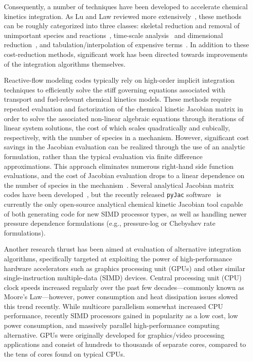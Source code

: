 \documentclass[preprint,12pt]{elsarticle}
\begin{document}
Consequently, a number of techniques have been developed to accelerate chemical kinetics integration.
As Lu and Law reviewed more extensively~\cite{Lu:2009gh}, these methods can be roughly categorized into three classes: skeletal reduction and removal of unimportant species and reactions~\cite{vajda_pca,rabitz_sa,turanyi_sa_1,turanyi_sa_2,Lu:2005,Lu:2006bb,valorani_csp,valorani_csp2,Lu:2008bi,Pepiot-Desjardins:2008,Niemeyer:2010bt,Niemeyer:2014,Curtis:2015aa}, time-scale analysis~\cite{qssa,pe_approx1,pe_approx2} and dimensional reduction~\cite{Lam:1988wc,Maas:1992aa,Lam:1993ub,Lam:1994ws,Lu:2001ve}, and tabulation\slash interpolation of expensive terms~\cite{Pope:1997wu,Christo1996,Tonse:1999aa}.
In addition to these cost-reduction methods, significant work has been directed towards improvements of the integration algorithms themselves.

Reactive-flow modeling codes typically rely on high-order implicit integration techniques to efficiently solve the stiff governing equations associated with transport and fuel-relevant chemical kinetics models.
These methods require repeated evaluation and factorization of the chemical kinetic Jacobian matrix in order to solve the associated non-linear algebraic equations through iterations of linear system solutions, the cost of which scales quadratically and cubically, respectively, with the number of species in a mechanism.
However, significant cost savings in the Jacobian evaluation can be realized through the use of an analytic formulation, rather than the typical evaluation via finite difference approximations.
This approach eliminates numerous right-hand side function evaluations, and the cost of Jacobian evaluation drops to a linear dependence on the number of species in the mechanism~\cite{Lu:2009gh}.
Several analytical Jacobian matrix codes have been developed~\cite{Safta:2011vn,Youssefi:2011tm,Bisetti:2012jw,Perini:2012gy,Dijkmans:2014bb}, but the recently released \texttt{pyJac} software~\cite{Niemeyer:2015im,Niemeyer:2015ws} is currently the only open-source analytical chemical kinetic Jacobian tool capable of both generating code for new SIMD processor types, as well as handling newer pressure dependence formulations (e.g., pressure-log or Chebyshev rate formulations).

Another research thrust has been aimed at evaluation of alternative integration algorithms, specifically targeted at exploiting the power of high-performance hardware accelerators such as graphics processing unit (GPUs) and other similar single-instruction multiple-data (SIMD) devices.
Central processing unit (CPU) clock speeds increased regularly over the past few decades---commonly known as Moore's Law---however, power consumption and heat dissipation issues slowed this trend recently.
While multicore parallelism somewhat increased CPU performance, recently SIMD processors gained in popularity as a low cost, low power consumption, and massively parallel high-performance computing alternative.
GPUs were originally developed for graphics\slash video processing applications and consist of hundreds to thousands of separate cores, compared to the tens of cores found on typical CPUs.
\end{document}
